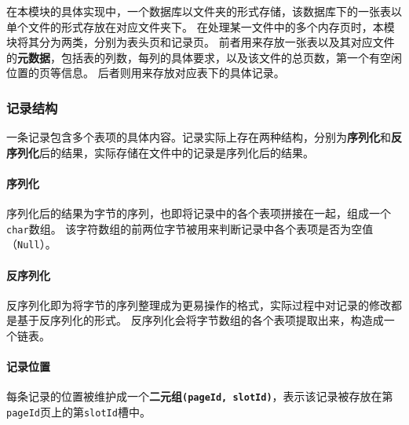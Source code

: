 \documentclass[11pt]{article}
\begin{document}
在本模块的具体实现中，一个数据库以文件夹的形式存储，该数据库下的一张表以单个文件的形式存放在对应文件夹下。 
在处理某一文件中的多个内存页时，本模块将其分为两类，分别为表头页和记录页。
前者用来存放一张表以及其对应文件的\textbf{元数据}，包括表的列数，每列的具体要求，以及该文件的总页数，第一个有空闲位置的页等信息。
后者则用来存放对应表下的具体记录。

\subsubsection{记录结构}
一条记录包含多个表项的具体内容。记录实际上存在两种结构，分别为\textbf{序列化}和\textbf{反序列化}后的结果，实际存储在文件中的记录是序列化后的结果。
\paragraph{序列化} 序列化后的结果为字节的序列，也即将记录中的各个表项拼接在一起，组成一个\texttt{char}数组。
该字符数组的前两位字节被用来判断记录中各个表项是否为空值（\texttt{Null}）。
\paragraph{反序列化} 反序列化即为将字节的序列整理成为更易操作的格式，实际过程中对记录的修改都是基于反序列化的形式。
反序列化会将字节数组的各个表项提取出来，构造成一个链表。
\paragraph{记录位置}\label{recordPosition} 每条记录的位置被维护成一个\textbf{二元组\texttt{(pageId, slotId)}}，表示该记录被存放在第\texttt{pageId}页上的第\texttt{slotId}槽中。
\end{document}
